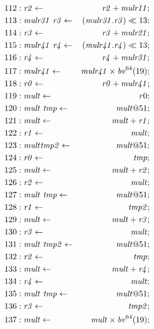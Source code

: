 {\begin{align*}
112 &: \mathit{r2} \leftarrow & \mathit{r2} + \mathit{mulr11}; \\
113 &: \mathit{mulr31}\ \mathit{r3} \leftarrow & (\mathit{mulr31}.\mathit{r3}) \ll 13; \\
114 &: \mathit{r3} \leftarrow & \mathit{r3} + \mathit{mulr21}; \\
115 &: \mathit{mulr41}\ \mathit{r4} \leftarrow & (\mathit{mulr41}.\mathit{r4}) \ll 13; \\
116 &: \mathit{r4} \leftarrow & \mathit{r4} + \mathit{mulr31}; \\
117 &: \mathit{mulr41} \leftarrow & \mathit{mulr41} \times \bv^{64}(19); \\
118 &: \mathit{r0} \leftarrow & \mathit{r0} + \mathit{mulr41}; \\
119 &: \mathit{mult} \leftarrow & r0; \\
120 &: \mathit{mult}\ \mathit{tmp} \leftarrow & \mathit{mult}@51; \\
121 &: \mathit{mult} \leftarrow & \mathit{mult} + \mathit{r1}; \\
122 &: \mathit{r1} \leftarrow & \mathit{mult}; \\
123 &: \mathit{mult} \mathit{tmp2} \leftarrow & \mathit{mult}@51; \\
124 &: \mathit{r0} \leftarrow & \mathit{tmp}; \\
125 &: \mathit{mult} \leftarrow & \mathit{mult} + \mathit{r2}; \\
126 &: \mathit{r2} \leftarrow & \mathit{mult}; \\
127 &: \mathit{mult}\ \mathit{tmp} \leftarrow & \mathit{mult}@51; \\
128 &: \mathit{r1} \leftarrow & \mathit{tmp2}; \\
129 &: \mathit{mult} \leftarrow & \mathit{mult} + \mathit{r3}; \\
130 &: \mathit{r3} \leftarrow & \mathit{mult}; \\
131 &: \mathit{mult}\ \mathit{tmp2} \leftarrow & \mathit{mult}@51; \\
132 &: \mathit{r2} \leftarrow & \mathit{tmp}; \\
133 &: \mathit{mult} \leftarrow & \mathit{mult} + \mathit{r4}; \\
134 &: \mathit{r4} \leftarrow & \mathit{mult}; \\
135 &: \mathit{mult}\ \mathit{tmp} \leftarrow & \mathit{mult}@51; \\
136 &: \mathit{r3} \leftarrow & \mathit{tmp2}; \\
137 &: \mathit{mult} \leftarrow & \mathit{mult} \times \bv^{64}(19); \\

\end{align*}}
